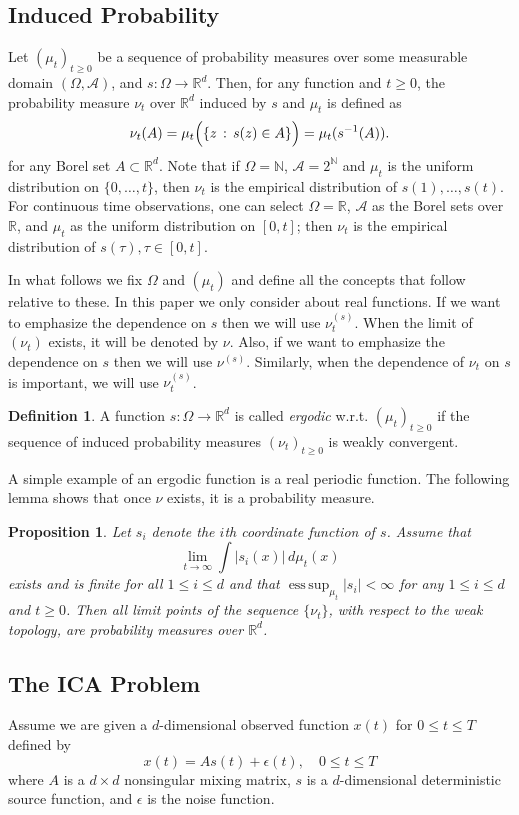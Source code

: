 \documentclass[twoside]{article}
\newcommand{\scom}[1]{s_{#1}}
\newcommand{\cset}[2]{\left\{#1\,:\,#2\right\}}
\newcommand{\ra}{\rightarrow}
\newcommand{\real}{\mathbb{R}}
\newcommand{\R}{\real}
\DeclareMathOperator{\esssup}{ess\,sup}
\renewcommand{\natural}{\mathbb{N}}
\newtheorem{prop}[lemma]{Proposition}
\theoremstyle{definition}
\newtheorem{definition}[lemma]{Definition}
\renewcommand{\AA}{\mathcal{A}}
\begin{document}
\subsection{Induced Probability}
\label{subsec:InducesProb}
Let  $(\mu_t)_{t\ge0}$ be a sequence of probability measures over some measurable domain $(\Omega,\AA)$, 
and $s: \Omega \ra \real^d$. Then,  for any function and $t\ge 0$, the probability measure $\nu_t$ over $\real^d$ induced by $s$ and $\mu_t$ is defined as
\[
\nu_t(A)= \mu_t\Bigl( \cset{z}{s(z)\in A} \Bigr)
= \mu_t ( s^{-1}(A) ).
\]
for any Borel set $A\subset \real^d$.
Note that if $\Omega = \natural$, $\AA = 2^\natural$ and $\mu_t$ is the uniform distribution on $\{0,\ldots,t\}$, then $\nu_t$ is the empirical distribution of $s(1),\ldots,s(t)$. For continuous time observations, one can select $\Omega=\R$, $\AA$ as the Borel sets over $\R$, and $\mu_t$ as the uniform distribution on $[0,t]$; then $\nu_t$ is the empirical distribution of $s(\tau), \tau \in [0,t]$.

In what follows we fix $\Omega$ and $(\mu_t)$ and define all the concepts that follow relative to these. 
In this paper we only consider about real functions. If we want to emphasize the dependence on $s$ then we will use $\nu_t^{(s)}$.
When the limit of $(\nu_t)$ exists, it will be denoted by $\nu$.
Also, if we want to emphasize the dependence on $s$ then we will use $\nu^{(s)}$.
Similarly, when the dependence of $\nu_t$ on $s$ is important, we will use $\nu^{(s)}_t$.
\begin{definition}
A function $s:\Omega \rightarrow \real^d$ is called \emph{ergodic} w.r.t. $(\mu_t)_{t\ge0}$
if the sequence of  induced probability measures $(\nu_t)_{t\ge 0}$ is weakly convergent.
\end{definition}
A simple example of an ergodic function is a real periodic function.
The following lemma shows that once $\nu$ exists, it is a probability measure. 
\begin{prop}
\label{prop:ergodicfunction}
Let $\scom{i}$ denote the $i$th coordinate function of $s$. Assume that
\[
\lim_{t\to\infty} \int |\scom{i}(x)|\, d\mu_t(x) 
\]
exists and is finite for all $1 \le i \le d$ and that $\esssup_{\mu_t} |\scom{i}|<\infty$ for any $1\le i \le d$ and $t\ge 0$.
Then all limit points of the sequence $\{\nu_t\}$, with respect to the weak topology, are probability measures over $\real^d$.
\end{prop}
\fi

\subsection{The ICA Problem}
\label{subsec:ICA}
Assume we are given a $d$-dimensional observed function $x(t)$ for $0\le t \le T$ defined by  
\begin{equation}
\label{equ:ICA}
x(t) = As(t)+\epsilon(t), \quad 0\le  t\le T
\end{equation}
where $A$ is a $d\times d$ nonsingular mixing matrix,  $s$ is a $d$-dimensional deterministic source function, and $\epsilon$ is the noise function. 
\end{document}
